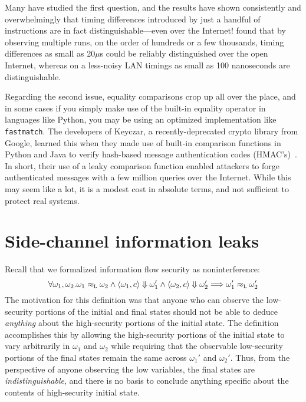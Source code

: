 \documentclass[11pt,twoside]{scrartcl}
\begin{document}
Many have studied the first question, and the results have shown consistently and overwhelmingly that timing differences introduced by just a handful of instructions are in fact distinguishable---even over the Internet!
\cite{crosby09} found that by observing multiple runs, on the order of hundreds or a few thousands, timing differences as small as 20$\mu$s could be reliably distinguished over the open Internet, whereas on a less-noisy LAN timings as small as 100 nanoseconds are distinguishable.

Regarding the second issue, equality comparisons crop up all over the place, and in some cases if you simply make use of the built-in  equality operator in languages like Python, you may be using an optimized implementation like \verb'fastmatch'.
The developers of Keyczar, a recently-deprecated crypto library from Google, learned this when they made use of built-in comparison functions in Python and Java to verify hash-based message authentication codes (HMAC's)~\cite{lawson09}.
In short, their use of a leaky comparison function enabled attackers to forge authenticated messages with a few million queries over the Internet.
While this may seem like a lot, it is a modest cost in absolute terms, and not sufficient to protect real systems.

\section{Side-channel information leaks}

Recall that we formalized information flow security as noninterference:
\begin{equation}
\label{eq:nonint}
\forall \omega_1,\omega_2 . \omega_1 \approx_\lowt \omega_2 \land \langle \omega_1, c\rangle \Downarrow \omega_1' \land \langle\omega_2, c\rangle\Downarrow\omega_2' \Longrightarrow \omega_1' \approx_\lowt \omega_2'
\end{equation}
The motivation for this definition was that anyone who can observe the low-security portions of the initial and final states should not be able to deduce \emph{anything} about the high-security portions of the initial state.
The definition accomplishes this by allowing the high-security portions of the initial state to vary arbitrarily in $\omega_1$ and $\omega_2$ while requiring that the observable low-security portions of the final states remain the same across $\omega_1'$ and $\omega_2'$.
Thus, from the perspective of anyone observing the low variables, the final states are \emph{indistinguishable}, and there is no basis to conclude anything specific about the contents of high-security initial state.
\end{document}

